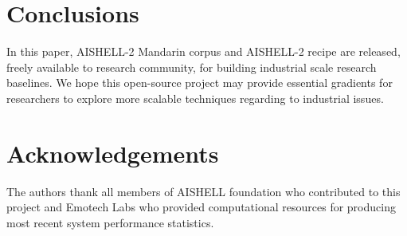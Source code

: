 \documentclass[a4paper]{article}
\begin{document}
% 

\section{Conclusions}

In this paper, AISHELL-2 Mandarin corpus and AISHELL-2 recipe are released,
freely available to research community, for building industrial scale research
baselines. We hope this open-source project may provide essential gradients for
researchers to explore more scalable techniques regarding to industrial
issues.

\section{Acknowledgements}

The authors thank all members of AISHELL foundation who contributed to this
project and Emotech Labs who provided computational resources for producing most recent system performance statistics.





\end{document}
